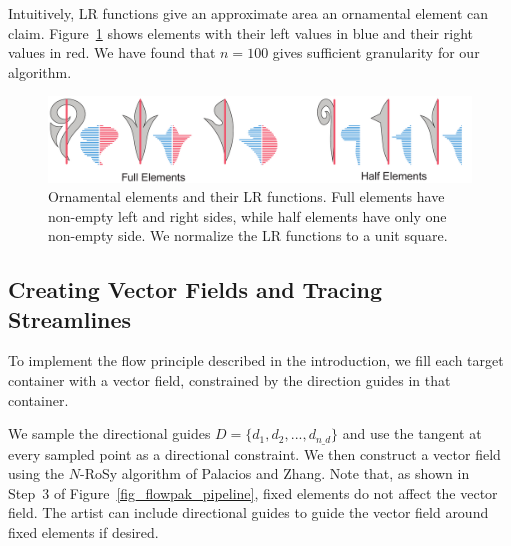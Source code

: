 Intuitively, LR functions give an approximate area an ornamental element can claim.
Figure~\ref{ornamental_shapes_fig} 
shows elements with their left values
in blue and their right values in red. We have found that $n = 100$ gives sufficient
granularity for our algorithm.

\begin{figure}[h!]
\centering
\includegraphics[width=1.0\textwidth]{figures/flowpak/ornaments.pdf}
\caption[Ornamental elements and their LR functions]
{\label{ornamental_shapes_fig}
Ornamental elements and their LR functions. Full elements have non-empty
left and right sides, while half elements have only one non-empty side. 
We normalize the LR functions to a unit square.}
\end{figure}

\subsection{Creating Vector Fields and Tracing Streamlines}
\label{flowpak_creating_vector_fields_and_tracing_streamlines}

To implement the flow principle described in the introduction, we fill each target
container with a vector field, constrained by the direction guides in that container.

We sample the directional guides $D = \{ d_{1}, d_{2}, ... , d_{n\text{\_}d}\}$  
and use the tangent at every sampled point as a directional constraint.
We then construct a vector field using the $N$-RoSy algorithm
of Palacios and Zhang\cite{Palacios2007}.  Note that, as shown in 
Step~3 of Figure~\ref{fig_flowpak_pipeline},
fixed elements do not affect the vector field.  
The artist can include directional guides to guide the vector field around fixed elements if desired.

